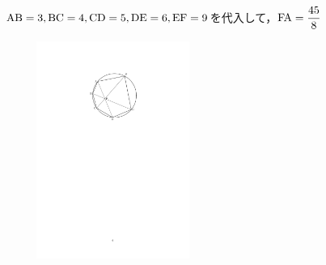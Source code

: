 \documentclass[a4paper,12pt,uplatex]{jsarticle}  %
\begin{document}
\begin{enumerate}
${\rm AB}=3, {\rm BC}=4, {\rm CD}=5, {\rm DE}=6, {\rm EF}=9$を代入して，${\rm FA}=\dfrac{45}{8}$
\begin{figure}[h]
  \centering
  \includegraphics[width=5.0cm]{jizen_2_2_solution.pdf}
\end{figure}



\end{enumerate}

\bigskip

\end{document}
